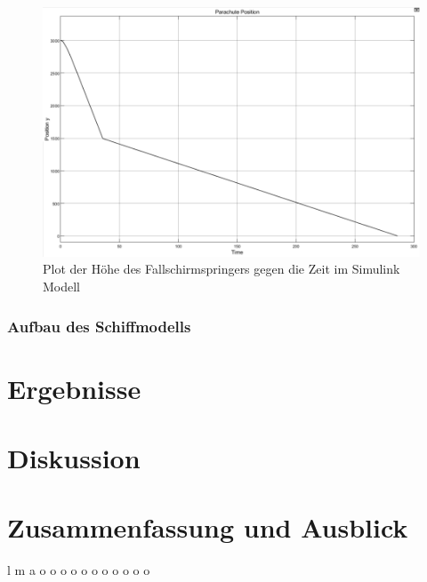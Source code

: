 \documentclass[]{iat}
\begin{document}
\begin{figure}[H]
    \includegraphics[width=\textwidth]{graphics/simulink_parachute_s_plot.png}
    \centering
    \caption{Plot der Höhe des Fallschirmspringers gegen die Zeit im Simulink Modell}
    \label{fig:simulink_parachute_s_plot}
\end{figure}

\newpage
\subsection{Aufbau des Schiffmodells} \label{sec:aufbau_schiffsmodell}

\chapter{Ergebnisse} \label{sec:ergebnisse}

\chapter{Diskussion} \label{sec:diskussion}

\chapter{Zusammenfassung und Ausblick} \label{sec:zsmfassung_ausblick}

l\cite[]{SpinningUp2018}
m\cite[]{Sutton1998}
a\cite[]{andrychowicz2021what}
o\cite[]{sac}
o\cite[]{Zelazny_2014}
o\cite[]{Kulczyk_Tabaczek_2014_2}
o\cite[]{hydrodynamicsNinova}
o\cite[]{Benedict2007ExplainingSD}
o\cite[]{FrocMasc2021}
o\cite[]{KrusComp2015}
o\cite[]{RichStat2019}
o\cite[]{pytorch}
o\cite[]{matpltlib}
o\cite[]{brockman2016openai}
\printbibliography
\end{document}
